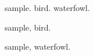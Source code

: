 \documentclass{article}
\begin{document}
\gls{sample}. \gls{bird}. \gls{waterfowl}.

\newpage

\gls{sample}, \gls{bird}.

\newpage

\gls{sample}, \gls{waterfowl}.

\printunsrtglossary[style=index]
\end{document}
